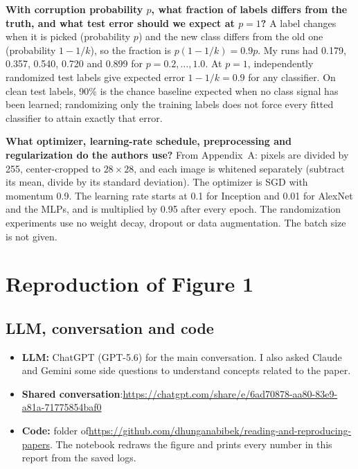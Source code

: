 \textbf{With corruption probability $p$, what fraction of labels differs from the truth, and what test error should we expect at $p=1$?} A label changes when it is picked (probability $p$) and the new class differs from the old one (probability $1-1/k$), so the fraction is $p(1-1/k)=0.9p$. My runs had 0.179, 0.357, 0.540, 0.720 and 0.899 for $p=0.2,\dots,1.0$. At $p=1$, independently randomized test labels give expected error $1-1/k=0.9$ for any classifier. On clean test labels, 90\% is the chance baseline expected when no class signal has been learned; randomizing only the training labels does not force every fitted classifier to attain exactly that error.

\textbf{What optimizer, learning-rate schedule, preprocessing and regularization do the authors use?} From Appendix~A: pixels are divided by 255, center-cropped to $28\times28$, and each image is whitened separately (subtract its mean, divide by its standard deviation). The optimizer is SGD with momentum 0.9. The learning rate starts at 0.1 for Inception and 0.01 for AlexNet and the MLPs, and is multiplied by 0.95 after every epoch. The randomization experiments use no weight decay, dropout or data augmentation. The batch size is not given.

\section{Reproduction of Figure 1}

\subsection{LLM, conversation and code}
\begin{itemize}
  \item \textbf{LLM:} ChatGPT (GPT-5.6) for the main conversation. I also asked Claude and Gemini some side questions to understand concepts related to the paper.
  \item \textbf{Shared conversation}:\newline \url{https://chatgpt.com/share/e/6ad70878-aa80-83e9-a81a-71775854baf0}
  \item \textbf{Code:} folder  of\newline \url{https://github.com/dhunganabibek/reading-and-reproducing-papers}. The notebook  redraws the figure and prints every number in this report from the saved logs.
\end{itemize}

